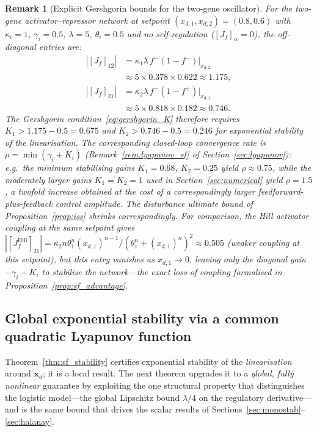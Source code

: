 \documentclass[12pt]{article}
\newtheorem{remark}{Remark}
\begin{document}
\begin{remark}[Explicit Gershgorin bounds for the two-gene oscillator]
\label{rem:gershgorin_numerical}
For the two-gene activator--repressor network at setpoint $(x_{d,1},x_{d,2})=(0.8,0.6)$
with $\kappa_i=1$, $\gamma_i=0.5$, $\lambda=5$, $\theta_i=0.5$ and no
self-regulation ($[J_f]_{ii}=0$), the off-diagonal entries are:
\begin{align*}
|[J_f]_{12}| &= \kappa_1\lambda\,f^-(1-f^-)\big|_{x_{d,2}}\\
  &\approx 5\times 0.378\times 0.622 \approx 1.175,\\
|[J_f]_{21}| &= \kappa_2\lambda\,f^+(1-f^+)\big|_{x_{d,1}}\\
  &\approx 5\times 0.818\times 0.182 \approx 0.746.
\end{align*}
The Gershgorin condition~\eqref{eq:gershgorin_K} therefore requires
$K_1 > 1.175 - 0.5 = 0.675$ and $K_2 > 0.746 - 0.5 = 0.246$
for exponential stability of the linearisation. The corresponding
closed-loop convergence rate is $\rho = \min(\gamma_i+K_i)$
(Remark~\ref{rem:lyapunov_sf} of Section~\ref{sec:lyapunov}): e.g.\
the minimum stabilising gains $K_1=0.68$, $K_2=0.25$ yield
$\rho \approx 0.75$, while the moderately larger gains $K_1=K_2=1$
used in Section~\ref{sec:numerical} yield $\rho=1.5$, a twofold
increase obtained at the cost of a correspondingly larger
feedforward-plus-feedback control amplitude. The disturbance ultimate
bound of Proposition~\ref{prop:iss} shrinks correspondingly.
For comparison, the Hill activator coupling at the same setpoint gives
$|[J_f^{\mathrm{Hill}}]_{21}| = \kappa_2 n\theta_1^n (x_{d,1})^{n-1}/(\theta_1^n+(x_{d,1})^n)^2\approx 0.505$
(weaker coupling at this setpoint), but this entry vanishes as
$x_{d,1}\to 0$, leaving only the diagonal gain $-\gamma_i-K_i$ to stabilise
the network---the exact loss of coupling formalised in
Proposition~\ref{prop:sf_advantage}.
\end{remark}

\subsection{Global exponential stability via a common quadratic Lyapunov function}
\label{sec:sf_global}

Theorem~\ref{thm:sf_stability} certifies exponential stability of the
\emph{linearisation} around $\mathbf{x}_d$; it is a local result. The
next theorem upgrades it to a \emph{global, fully nonlinear} guarantee
by exploiting the one structural property that distinguishes the
logistic model---the global Lipschitz bound $\lambda/4$ on the
regulatory derivative---and is the same bound that drives the scalar
results of Sections~\ref{sec:monostab}--\ref{sec:halanay}.
\end{document}
